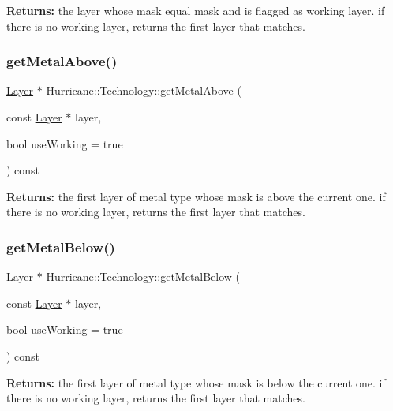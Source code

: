 {\bfseries Returns\+:} the layer whose mask equal {\ttfamily mask} and is flagged as working layer. if there is no working layer, returns the first layer that matches. \mbox{\label{classHurricane_1_1Technology_af5723b08c9d289ffef8159ac2ea71b74}} 
\subsubsection{\texorpdfstring{get\+Metal\+Above()}{getMetalAbove()}}
{\footnotesize\ttfamily \mbox{\hyperlink{classHurricane_1_1Layer}{Layer}} $\ast$ Hurricane\+::\+Technology\+::get\+Metal\+Above (\begin{DoxyParamCaption}\item[{const \mbox{\hyperlink{classHurricane_1_1Layer}{Layer}} $\ast$}]{layer,  }\item[{bool}]{use\+Working = {\ttfamily true} }\end{DoxyParamCaption}) const}

{\bfseries Returns\+:} the first layer of metal type whose mask is above the current one. if there is no working layer, returns the first layer that matches. \mbox{\label{classHurricane_1_1Technology_ae02123406c7362cc14413727e8689d5a}} 
\subsubsection{\texorpdfstring{get\+Metal\+Below()}{getMetalBelow()}}
{\footnotesize\ttfamily \mbox{\hyperlink{classHurricane_1_1Layer}{Layer}} $\ast$ Hurricane\+::\+Technology\+::get\+Metal\+Below (\begin{DoxyParamCaption}\item[{const \mbox{\hyperlink{classHurricane_1_1Layer}{Layer}} $\ast$}]{layer,  }\item[{bool}]{use\+Working = {\ttfamily true} }\end{DoxyParamCaption}) const}

{\bfseries Returns\+:} the first layer of metal type whose mask is below the current one. if there is no working layer, returns the first layer that matches. \mbox{\label{classHurricane_1_1Technology_ac7125a8eea871918e74bb295c56caceb}} 
